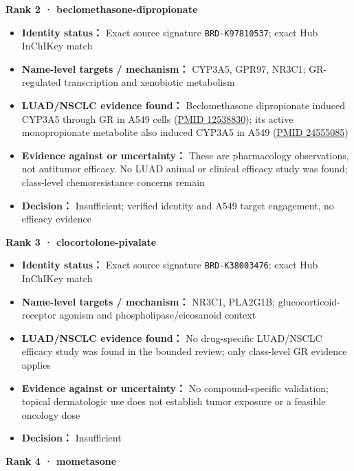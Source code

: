 \documentclass[
  10pt,
]{ctexart}
\providecommand{\tightlist}{%
  \setlength{\itemsep}{0pt}\setlength{\parskip}{0pt}}
\begin{document}
\textbf{Rank 2 · beclomethasone-dipropionate}

\begin{itemize}
\tightlist
\item
  \textbf{Identity status：} Exact source signature
  \texttt{BRD-K97810537}; exact Hub InChIKey match
\item
  \textbf{Name-level targets / mechanism：} CYP3A5, GPR97, NR3C1;
  GR-regulated transcription and xenobiotic metabolism
\item
  \textbf{LUAD/NSCLC evidence found：} Beclomethasone dipropionate
  induced CYP3A5 through GR in A549 cells
  (\href{https://pubmed.ncbi.nlm.nih.gov/12538830/}{PMID 12538830}); its
  active monopropionate metabolite also induced CYP3A5 in A549
  (\href{https://pubmed.ncbi.nlm.nih.gov/24555085/}{PMID 24555085})
\item
  \textbf{Evidence against or uncertainty：} These are pharmacology
  observations, not antitumor efficacy. No LUAD animal or clinical
  efficacy study was found; class-level chemoresistance concerns remain
\item
  \textbf{Decision：} Insufficient; verified identity and A549 target
  engagement, no efficacy evidence
\end{itemize}

\textbf{Rank 3 · clocortolone-pivalate}

\begin{itemize}
\tightlist
\item
  \textbf{Identity status：} Exact source signature
  \texttt{BRD-K38003476}; exact Hub InChIKey match
\item
  \textbf{Name-level targets / mechanism：} NR3C1, PLA2G1B;
  glucocorticoid-receptor agonism and phospholipase/eicosanoid context
\item
  \textbf{LUAD/NSCLC evidence found：} No drug-specific LUAD/NSCLC
  efficacy study was found in the bounded review; only class-level GR
  evidence applies
\item
  \textbf{Evidence against or uncertainty：} No compound-specific
  validation; topical dermatologic use does not establish tumor exposure
  or a feasible oncology dose
\item
  \textbf{Decision：} Insufficient
\end{itemize}

\textbf{Rank 4 · mometasone}
\end{document}
